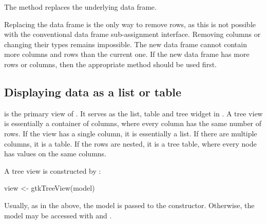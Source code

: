 The  method replaces the underlying
data frame.
\begin{Schunk}
\end{Schunk}
%
Replacing the data frame is the only way to remove rows, as this is
not possible with the conventional data frame sub-assignment
interface. Removing columns or changing their types remains
impossible. The new data frame cannot contain more columns and rows
than the current one. If the new data frame has more rows or columns,
then the appropriate  method should be used first.

\subsection{Displaying data as a list or table}
\label{sec:RGtk2:mvc:GtkTreeView}

 is the primary view of .  It
serves as the list, table and tree widget in \GTK. A tree view is
essentially a container of columns, where every column has the same
number of rows. If the view has a single column, it is essentially a
list. If there are multiple columns, it is a table. If the rows are
nested, it is a tree table, where every node has values on the same
columns.

A tree view is constructed by :
\begin{Schunk}
\begin{Sinput}
 view <- gtkTreeView(model)
\end{Sinput}
\end{Schunk}
Usually, as in the above, the model is passed to the
constructor. Otherwise, the model may be accessed with
 and .


